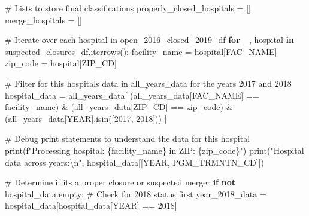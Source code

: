 \documentclass[
  letterpaper,
  DIV=11,
  numbers=noendperiod]{scrartcl}
\newenvironment{Shaded}{\begin{snugshade}}{\end{snugshade}}
\newcommand{\BuiltInTok}[1]{\textcolor[rgb]{0.00,0.23,0.31}{#1}}
\newcommand{\CharTok}[1]{\textcolor[rgb]{0.13,0.47,0.30}{#1}}
\newcommand{\CommentTok}[1]{\textcolor[rgb]{0.37,0.37,0.37}{#1}}
\newcommand{\ControlFlowTok}[1]{\textcolor[rgb]{0.00,0.23,0.31}{\textbf{#1}}}
\newcommand{\DecValTok}[1]{\textcolor[rgb]{0.68,0.00,0.00}{#1}}
\newcommand{\KeywordTok}[1]{\textcolor[rgb]{0.00,0.23,0.31}{\textbf{#1}}}
\newcommand{\NormalTok}[1]{\textcolor[rgb]{0.00,0.23,0.31}{#1}}
\newcommand{\OperatorTok}[1]{\textcolor[rgb]{0.37,0.37,0.37}{#1}}
\newcommand{\SpecialCharTok}[1]{\textcolor[rgb]{0.37,0.37,0.37}{#1}}
\newcommand{\SpecialStringTok}[1]{\textcolor[rgb]{0.13,0.47,0.30}{#1}}
\newcommand{\StringTok}[1]{\textcolor[rgb]{0.13,0.47,0.30}{#1}}
\begin{document}
\begin{Shaded}
\begin{Highlighting}[]
\CommentTok{\# Lists to store final classifications}
\NormalTok{properly\_closed\_hospitals }\OperatorTok{=}\NormalTok{ []}
\NormalTok{merge\_hospitals }\OperatorTok{=}\NormalTok{ []}

\CommentTok{\# Iterate over each hospital in open\_2016\_closed\_2019\_df}
\ControlFlowTok{for}\NormalTok{ \_, hospital }\KeywordTok{in}\NormalTok{ suspected\_closures\_df.iterrows():}
\NormalTok{    facility\_name }\OperatorTok{=}\NormalTok{ hospital[}\StringTok{\textquotesingle{}FAC\_NAME\textquotesingle{}}\NormalTok{]}
\NormalTok{    zip\_code }\OperatorTok{=}\NormalTok{ hospital[}\StringTok{\textquotesingle{}ZIP\_CD\textquotesingle{}}\NormalTok{]}
    
    \CommentTok{\# Filter for this hospital\textquotesingle{}s data in all\_years\_data for the years 2017 and 2018}
\NormalTok{    hospital\_data }\OperatorTok{=}\NormalTok{ all\_years\_data[}
\NormalTok{        (all\_years\_data[}\StringTok{\textquotesingle{}FAC\_NAME\textquotesingle{}}\NormalTok{] }\OperatorTok{==}\NormalTok{ facility\_name) }\OperatorTok{\&} 
\NormalTok{        (all\_years\_data[}\StringTok{\textquotesingle{}ZIP\_CD\textquotesingle{}}\NormalTok{] }\OperatorTok{==}\NormalTok{ zip\_code) }\OperatorTok{\&}
\NormalTok{        (all\_years\_data[}\StringTok{\textquotesingle{}YEAR\textquotesingle{}}\NormalTok{].isin([}\DecValTok{2017}\NormalTok{, }\DecValTok{2018}\NormalTok{]))}
\NormalTok{    ]}

    \CommentTok{\# Debug print statements to understand the data for this hospital}
    \BuiltInTok{print}\NormalTok{(}\SpecialStringTok{f"Processing hospital: }\SpecialCharTok{\{}\NormalTok{facility\_name}\SpecialCharTok{\}}\SpecialStringTok{ in ZIP: }\SpecialCharTok{\{}\NormalTok{zip\_code}\SpecialCharTok{\}}\SpecialStringTok{"}\NormalTok{)}
    \BuiltInTok{print}\NormalTok{(}\StringTok{"Hospital data across years:}\CharTok{\textbackslash{}n}\StringTok{"}\NormalTok{, hospital\_data[[}\StringTok{\textquotesingle{}YEAR\textquotesingle{}}\NormalTok{, }\StringTok{\textquotesingle{}PGM\_TRMNTN\_CD\textquotesingle{}}\NormalTok{]])}

    \CommentTok{\# Determine if it\textquotesingle{}s a proper closure or suspected merger}
    \ControlFlowTok{if} \KeywordTok{not}\NormalTok{ hospital\_data.empty:}
        \CommentTok{\# Check for 2018 status first}
\NormalTok{        year\_2018\_data }\OperatorTok{=}\NormalTok{ hospital\_data[hospital\_data[}\StringTok{\textquotesingle{}YEAR\textquotesingle{}}\NormalTok{] }\OperatorTok{==} \DecValTok{2018}\NormalTok{]}
        

\end{Highlighting}
\end{Shaded}
\end{document}

